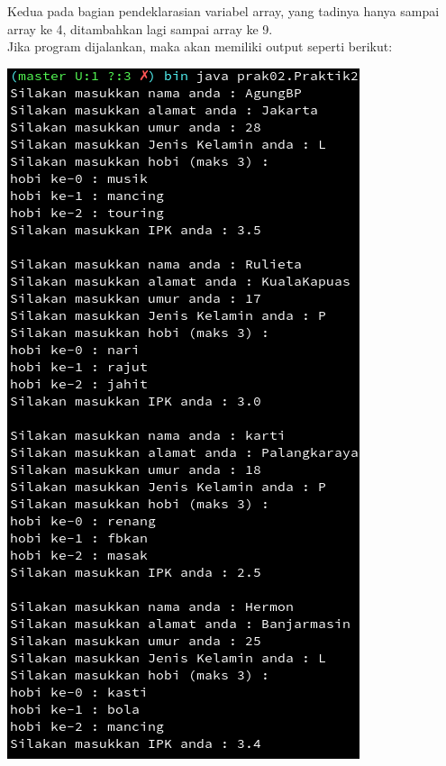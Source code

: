 \documentclass[a4paper,12pt]{article}
\begin{document}
Kedua pada bagian pendeklarasian variabel array, yang tadinya hanya sampai array ke 4, ditambahkan lagi sampai array
ke 9.\\
Jika program dijalankan, maka akan memiliki output seperti berikut:
\begin{center}
    \includegraphics[scale=.7]{out-prak2-1.png} 

\end{center}
\end{document}
